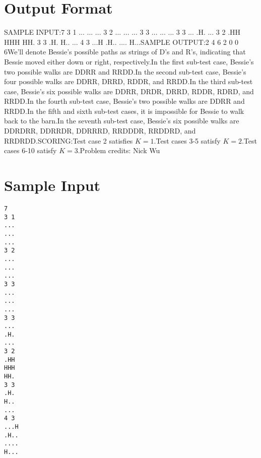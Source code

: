 \documentclass[12pt]{article}
\begin{document}
\section*{Output Format}
SAMPLE INPUT:7
3 1
...
...
...
3 2
...
...
...
3 3
...
...
...
3 3
...
.H.
...
3 2
.HH
HHH
HH.
3 3
.H.
H..
...
4 3
...H
.H..
....
H...SAMPLE OUTPUT:2
4
6
2
0
0
6We'll denote Bessie's possible paths as strings of D's and R's, indicating that
Bessie moved either down or right, respectively.In the first sub-test case, Bessie's two possible walks are DDRR and RRDD.In the second sub-test case, Bessie's four possible walks are DDRR, DRRD, RDDR,
and RRDD.In the third sub-test case, Bessie's six possible walks are DDRR, DRDR, DRRD,
RDDR, RDRD, and RRDD.In the fourth sub-test case, Bessie's two possible walks are DDRR and RRDD.In the fifth and sixth sub-test cases, it is impossible for Bessie to walk back
to the barn.In the seventh sub-test case, Bessie's six possible walks are DDRDRR, DDRRDR,
DDRRRD, RRDDDR, RRDDRD, and RRDRDD.SCORING:Test case 2 satisfies $K = 1$.Test cases 3-5 satisfy $K = 2$.Test cases 6-10 satisfy $K = 3$.Problem credits: Nick Wu

\section*{Sample Input}
\begin{verbatim}
7
3 1
...
...
...
3 2
...
...
...
3 3
...
...
...
3 3
...
.H.
...
3 2
.HH
HHH
HH.
3 3
.H.
H..
...
4 3
...H
.H..
....
H...
\end{verbatim}
\end{document}
